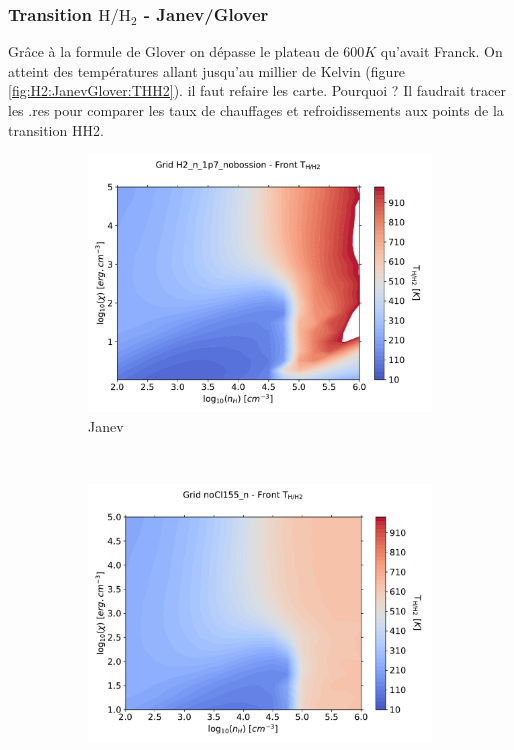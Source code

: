 

\subsubsection{Transition $\mathrm{H}/\mathrm{H}_2$ - Janev/Glover}

Grâce à la formule de Glover on dépasse le plateau de $600 K$ qu'avait Franck. On atteint des températures allant jusqu'au millier de Kelvin (figure \ref{fig:H2:JanevGlover:THH2}). il faut refaire les carte. Pourquoi ? Il faudrait tracer les .res pour comparer les taux de chauffages et refroidissements aux points de la transition HH2. 

\begin{figure}[!htbp]
    \centering
    \begin{subfigure}[t]{0.45\textwidth} %
        \centering \includegraphics[trim = {0 0 0 0 },clip,width=1\textwidth]{figure/H2/JanevGlover/janev/HH2_T_Franck.pdf}
        \caption{Janev}
    \end{subfigure}
    ~ 
    \begin{subfigure}[t]{0.45\textwidth}
        \centering \includegraphics[trim = {0 0 0 0 },clip,width=1\textwidth]{figure/H2/JanevGlover/glover/HH2_T_Franck.pdf}

\end{subfigure}
\end{figure}
